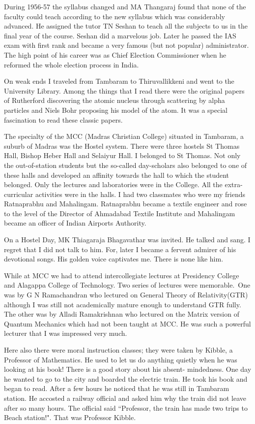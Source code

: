 During 1956-57 the syllabus changed and MA Thangaraj fou\-nd that none of 
the faculty could teach according to the new syllabus which was 
considerably advanced. He assigned the tutor TN Seshan to teach all the 
subjects to us in the final year of the course. Seshan did a marvelous 
job. Later he passed the IAS exam with first rank and became a very 
famous (but not popu\-lar) administrator. The high point of his career was 
as Chief Election\- Commissioner when he reformed the whole election 
process in India.


On weak ends I traveled from Tambaram to Thiruvallikkeni and went to 
the University Library. Among the things that I read there were the 
original papers of Rutherford discovering the atomic nucleus through 
scattering by alpha particles and Niels Bohr proposing his model of the 
atom. It was a special fascina\-tion to read these classic papers.
 
The specialty of the MCC (Madras Christian College) situated in 
Tambaram, a suburb of Madras was the Hostel system. There were three 
hostels St Thomas Hall, Bishop Heber Hall and Selaiyur Hall. I belonged 
to St Thomas. Not only the out-of-station students but the so-called 
day-scholars also belonged to one of these halls and developed an 
affinity towards the hall to which the student belonged. Only the 
lectures and laboratories were in the College. All the extra-curricular 
activities were in the halls. I had two classmates who were my friends 
Ratna\-prabhu and Mahalingam. Ratnaprabhu became a textile engineer and 
rose to the level of the Director of Ahmadabad Textile Institute and 
Mahalingam became an officer of Indian Airports Authority.

On a Hostel Day, MK Thiagaraja Bhagavathar was invited. He talked and 
sang. I regret that I did not talk to him. For, later I became a fervent 
admirer of his devotional songs. His golden voice captivates me. There 
is none like him.


While at MCC we had to attend intercollegiate lectures at Presidency 
College and Alagappa College of Technology. Two series of lectures were 
memorable.\ One was by G N Rama{chandran} who lectured on General Theory of 
Relativity(GTR) although I was still not academically mature enough to 
understand GTR fully. The other was by Alladi Ramakrishnan who lectured 
on the Matrix version of Quantum Mechanics which had not been taught at 
MCC. He was such a powerful lecturer that I was impressed very much.

Here also there were moral instruction classes; they were taken by 
Kibble, a Professor of Mathematics. He used to let us do anything 
quietly when he was looking at his book! There is a good story about his 
absent- mindedness. One day he wanted to go to the city and boarded the 
electric train. He took his book and began to read. After a few hours he 
noticed that he was still in Tambaram station. He accosted a railway 
official and asked him why the train did not leave after so many hours. 
The official said ``Professor, the train has made two trips to Beach 
station!". That was Professor Kibble.

